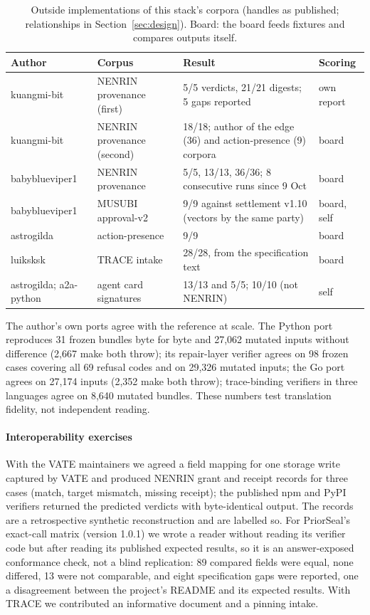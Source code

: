 \documentclass[preprint,12pt,authoryear]{elsarticle}
\begin{document}
\begin{table}[t]
\centering
\caption{Outside implementations of this stack's corpora (handles as published; relationships in Section~\ref{sec:design}). Board: the board feeds fixtures and compares outputs itself.}
\label{tab:outside}
\small
\begin{tabularx}{\textwidth}{@{}l l L l@{}}
\toprule
Author & Corpus & Result & Scoring \\
\midrule
kuangmi-bit & NENRIN provenance (first) & 5/5 verdicts, 21/21 digests; 5 gaps reported & own report \\
kuangmi-bit & NENRIN provenance (second) & 18/18; author of the edge (36) and action-presence (9) corpora & board \\
babyblueviper1 & NENRIN provenance & 5/5, 13/13, 36/36; 8 consecutive runs since 9 Oct & board \\
babyblueviper1 & MUSUBI approval-v2 & 9/9 against settlement v1.10 (vectors by the same party) & board, self \\
astrogilda & action-presence & 9/9 & board \\
luiksksk & TRACE intake & 28/28, from the specification text & board \\
astrogilda; a2a-python & agent card signatures & 13/13 and 5/5; 10/10 (not NENRIN) & self \\
\bottomrule
\end{tabularx}
\end{table}

The author's own ports agree with the reference at scale. The Python port reproduces 31 frozen bundles byte for byte and 27,062 mutated inputs without difference (2,667 make both throw); its repair-layer verifier agrees on 98 frozen cases covering all 69 refusal codes and on 29,326 mutated inputs; the Go port agrees on 27,174 inputs (2,352 make both throw); trace-binding verifiers in three languages agree on 8,640 mutated bundles. These numbers test translation fidelity, not independent reading.

\paragraph{Interoperability exercises} With the VATE maintainers we agreed a field mapping for one storage write captured by VATE and produced NENRIN grant and receipt records for three cases (match, target mismatch, missing receipt); the published npm and PyPI verifiers returned the predicted verdicts with byte-identical output. The records are a retrospective synthetic reconstruction and are labelled so. For PriorSeal's exact-call matrix (version 1.0.1) we wrote a reader without reading its verifier code but after reading its published expected results, so it is an answer-exposed conformance check, not a blind replication: 89 compared fields were equal, none differed, 13 were not comparable, and eight specification gaps were reported, one a disagreement between the project's README and its expected results. With TRACE we contributed an informative document and a pinning intake.
\end{document}
